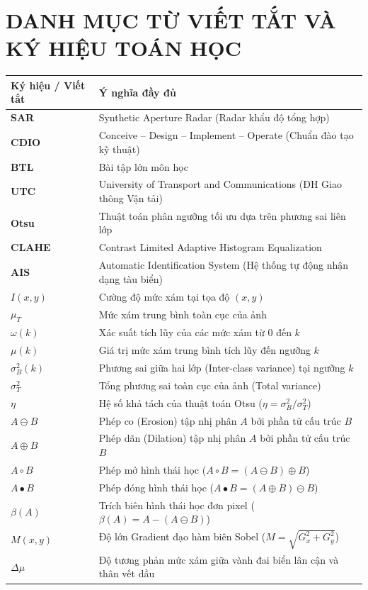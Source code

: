 \newpage
\tableofcontents
\newpage
\listoffigures
\newpage
\listoftables

\newpage
\section*{DANH MỤC TỪ VIẾT TẮT VÀ KÝ HIỆU TOÁN HỌC}

\begin{table}[H]
\centering
\begin{tabular}{ll}
\toprule
\textbf{Ký hiệu / Viết tắt} & \textbf{Ý nghĩa đầy đủ} \\
\midrule
\textbf{SAR} & Synthetic Aperture Radar (Radar khẩu độ tổng hợp) \\
\textbf{CDIO} & Conceive -- Design -- Implement -- Operate (Chuẩn đào tạo kỹ thuật) \\
\textbf{BTL} & Bài tập lớn môn học \\
\textbf{UTC} & University of Transport and Communications (ĐH Giao thông Vận tải) \\
\textbf{Otsu} & Thuật toán phân ngưỡng tối ưu dựa trên phương sai liên lớp \\
\textbf{CLAHE} & Contrast Limited Adaptive Histogram Equalization \\
\textbf{AIS} & Automatic Identification System (Hệ thống tự động nhận dạng tàu biển) \\
$I(x,y)$ & Cường độ mức xám tại tọa độ $(x, y)$ \\
$\mu_T$ & Mức xám trung bình toàn cục của ảnh \\
$\omega(k)$ & Xác suất tích lũy của các mức xám từ 0 đến $k$ \\
$\mu(k)$ & Giá trị mức xám trung bình tích lũy đến ngưỡng $k$ \\
$\sigma_B^2(k)$ & Phương sai giữa hai lớp (Inter-class variance) tại ngưỡng $k$ \\
$\sigma_T^2$ & Tổng phương sai toàn cục của ảnh (Total variance) \\
$\eta$ & Hệ số khả tách của thuật toán Otsu ($\eta = \sigma_B^2 / \sigma_T^2$) \\
$A \ominus B$ & Phép co (Erosion) tập nhị phân $A$ bởi phần tử cấu trúc $B$ \\
$A \oplus B$ & Phép dãn (Dilation) tập nhị phân $A$ bởi phần tử cấu trúc $B$ \\
$A \circ B$ & Phép mở hình thái học ($A \circ B = (A \ominus B) \oplus B$) \\
$A \bullet B$ & Phép đóng hình thái học ($A \bullet B = (A \oplus B) \ominus B$) \\
$\beta(A)$ & Trích biên hình thái học đơn pixel ($\beta(A) = A - (A \ominus B)$) \\
$M(x,y)$ & Độ lớn Gradient đạo hàm biên Sobel ($M = \sqrt{G_x^2 + G_y^2}$) \\
$\Delta \mu$ & Độ tương phản mức xám giữa vành đai biển lân cận và thân vết dầu \\
\bottomrule
\end{tabular}
\end{table}
